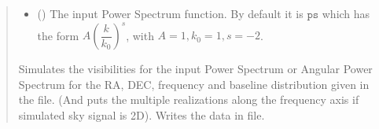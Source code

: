 \documentclass[a4paper,11pt,oneside,english,openany]{sphinxmanual}
\begin{document}
\begin{fulllineitems}
\begin{quote}
\begin{description}
\begin{itemize}
\item {} 
\sphinxAtStartPar
{} () \textendash{} The input Power Spectrum function. By default it is \(\texttt{ps}\) which has the form \(A \left(\dfrac{k}{k_0}\right)^{s}\), with \(A=1, k_0=1, s=-2\).

\end{itemize}

\sphinxAtStartPar
Simulates the visibilities for the input Power Spectrum or Angular Power Spectrum for the RA, DEC, frequency and baseline distribution given in the  file. (And puts the multiple realizations along the frequency axis if simulated sky signal is 2D). Writes the data in  file.

\end{description}\end{quote}

\end{fulllineitems}




\renewcommand{\indexname}{Index}
\printindex
\end{document}
